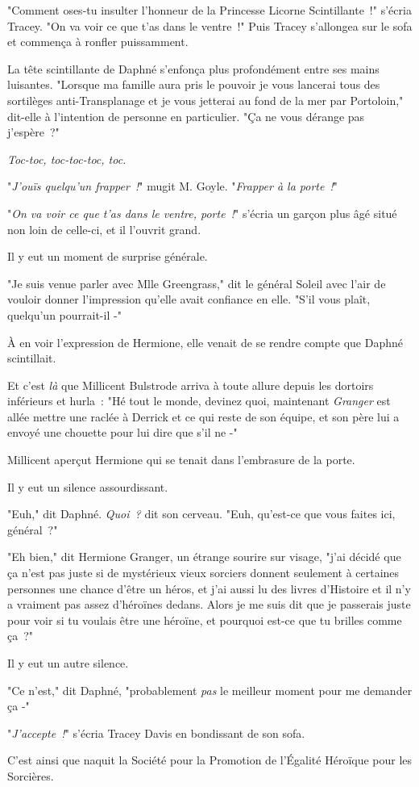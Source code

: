 "Comment oses-tu insulter l'honneur de la Princesse Licorne Scintillante~!" s'écria Tracey. "On va voir ce que t'as dans le ventre~!" Puis Tracey s'allongea sur le sofa et commença à ronfler puissamment.

La tête scintillante de Daphné s'enfonça plus profondément entre ses mains luisantes. "Lorsque ma famille aura pris le pouvoir je vous lancerai tous des sortilèges anti-Transplanage et je vous jetterai au fond de la mer par Portoloin," dit-elle à l'intention de personne en particulier. "Ça ne vous dérange pas j'espère~?"

\emph{Toc-toc, toc-toc-toc, toc.}

"\emph{J'ouïs quelqu'un frapper~!}" mugit M. Goyle. "\emph{Frapper à la porte~!}"

"\emph{On va voir ce que t'as dans le ventre, porte~!}" s'écria un garçon plus âgé situé non loin de celle-ci, et il l'ouvrit grand.

Il y eut un moment de surprise générale.

"Je suis venue parler avec Mlle Greengrass," dit le général Soleil avec l'air de vouloir donner l'impression qu'elle avait confiance en elle. "S'il vous plaît, quelqu'un pourrait-il -"

À en voir l'expression de Hermione, elle venait de se rendre compte que Daphné scintillait.

Et c'est \emph{là} que Millicent Bulstrode arriva à toute allure depuis les dortoirs inférieurs et hurla~: "Hé tout le monde, devinez quoi, maintenant \emph{Granger} est allée mettre une raclée à Derrick et ce qui reste de son équipe, et son père lui a envoyé une chouette pour lui dire que s'il ne -"

Millicent aperçut Hermione qui se tenait dans l'embrasure de la porte.

Il y eut un silence assourdissant.

"Euh," dit Daphné. \emph{Quoi~?} dit son cerveau. "Euh, qu'est-ce que vous faites ici, général~?"

"Eh bien," dit Hermione Granger, un étrange sourire sur visage, "j'ai décidé que ça n'est pas juste si de mystérieux vieux sorciers donnent seulement à certaines personnes une chance d'être un héros, et j'ai aussi lu des livres d'Histoire et il n'y a vraiment pas assez d'héroïnes dedans. Alors je me suis dit que je passerais juste pour voir si tu voulais être une héroïne, et pourquoi est-ce que tu brilles comme ça~?"

Il y eut un autre silence.

"Ce n'est," dit Daphné, "probablement \emph{pas} le meilleur moment pour me demander ça -"

"\emph{J'accepte~!}" s'écria Tracey Davis en bondissant de son sofa.

\later

C'est ainsi que naquit la Société pour la Promotion de l'Égalité Héroïque pour les Sorcières. 

